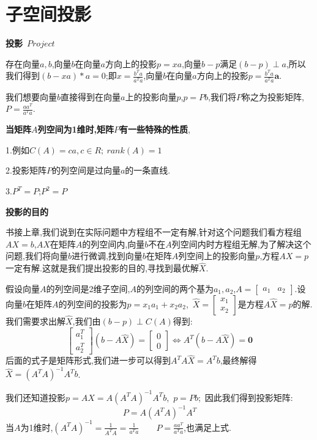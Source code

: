 \documentclass[oneside]{book}
\begin{document}
	\chapter{子空间投影}
	\textbf{投影}\  $Project$
	
	存在向量$a,b$,向量$b$在向量$a$方向上的投影$p=xa$,向量$b-p$满足$(b-p)\perp a$,所以我们得到$(b-xa)*a=0$;即$x=\frac{b^{T}a}{a^{T}a}$,向量$b$在向量$a$方向上的投影$p=\frac{b^{T}a}{a^{T}a}\textbf{a}$.
	
	我们想要向量$b$直接得到在向量$a$上的投影向量$p$,$p=Pb$,我们将$P$称之为投影矩阵,$P=\frac{aa^{T}}{a^{T}a}$.
	
	\textbf{当矩阵$A$列空间为1维时,矩阵$P$有一些特殊的性质},
	
	1.例如$C(A)=ca,c\in R;\ rank(A)=1$
	
	2.投影矩阵$P$的列空间是过向量$a$的一条直线.
	
	3.$P^{T}=P$;\qquad $P^{2}=P$
	
	\textbf{投影的目的}
	
	书接上章,我们说到在实际问题中方程组不一定有解,针对这个问题我们看方程组$AX=b$,$AX$在矩阵$A$的列空间内,向量$b$不在$A$列空间内时方程组无解,为了解决这个问题,我们将向量$b$进行微调,找到向量$b$在矩阵$A$列空间上的投影向量$p$,方程$AX=p$一定有解.这就是我们提出投影的目的,寻找到最优解$\hat{X}$.
	
	假设向量$A$的列空间是2维子空间,$A$的列空间的两个基为$a_{1},a_{2}$,\quad $A=\left[\begin{array}{cc}
		a_{1}&a_{2}
	\end{array}\right]$.\quad 设向量$b$在矩阵$A$的列空间的投影为$p=x_{1}a_{1}+x_{2}a_{2}$,\ $\hat{X}=\left[\begin{array}{c}
	x_{1}\\x_{2}
\end{array}\right]$是方程$A\hat{X}=p$的解.我们需要求出解$\hat{X}$,我们由$(b-p)\perp C(A)$得到:
	\begin{equation}
		\left[\begin{array}{c}
			a_{1}^{T}\\a_{2}^{T}
		\end{array}\right](b-A\hat{X})=\left[\begin{array}{c}
		0\\0
	\end{array}\right]\Leftrightarrow A^{T}(b-A\hat{X})=\textbf{0}
	\end{equation}
	后面的式子是矩阵形式,我们进一步可以得到$A^{T}A\hat{X}=A^{T}b$,最终解得$\hat{X}=(A^{T}A)^{-1}A^{T}b$.
	
	我们还知道投影$p=A\hat{X}=A(A^{T}A)^{-1}A^{T}b$,\ $p=Pb$;\  因此我们得到投影矩阵:$$P=A(A^{T}A)^{-1}A^{T}$$
	当$A$为1维时,$(A^{T}A)^{-1}=\frac{1}{A^{T}A}=\frac{1}{a^{T}a}\qquad P=\frac{aa^{T}}{a^{T}a}$,也满足上式.
	
\end{document}
